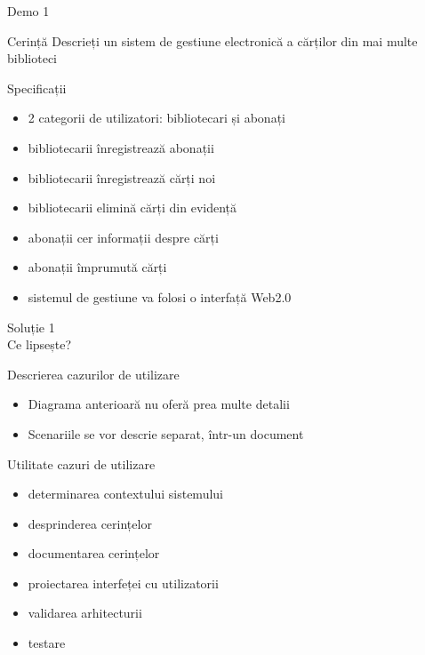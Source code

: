 \documentclass{beamer}
\begin{document}
\begin{frame}{Demo 1}
  \begin{exampleblock}{Cerință}
    Descrieți un sistem de gestiune electronică a cărților din mai multe
    biblioteci
  \end{exampleblock}
  \begin{exampleblock}{Specificații}
    \begin{itemize}
      \item 2 categorii de utilizatori: bibliotecari și abonați
      \item bibliotecarii înregistrează abonații
      \item bibliotecarii înregistrează cărți noi
      \item bibliotecarii elimină cărți din evidență
      \item abonații cer informații despre cărți
      \item abonații împrumută cărți
      \item sistemul de gestiune va folosi o interfață Web2.0
    \end{itemize}
  \end{exampleblock}
\end{frame}

\begin{frame}{Soluție 1}
  \\
  Ce lipsește?
\end{frame}

\begin{frame}{Descrierea cazurilor de utilizare}
  \begin{itemize}[<+->]
    \item Diagrama anterioară nu oferă prea multe detalii
    \item Scenariile se vor descrie separat, într-un document
  \end{itemize}
\end{frame}

\begin{frame}{Utilitate cazuri de utilizare}
  \begin{itemize}[<+->]
    \item determinarea contextului sistemului
    \item desprinderea cerințelor
    \item documentarea cerințelor
    \item proiectarea interfeței cu utilizatorii
    \item validarea arhitecturii
    \item testare
  \end{itemize}
\end{frame}
\end{document}
